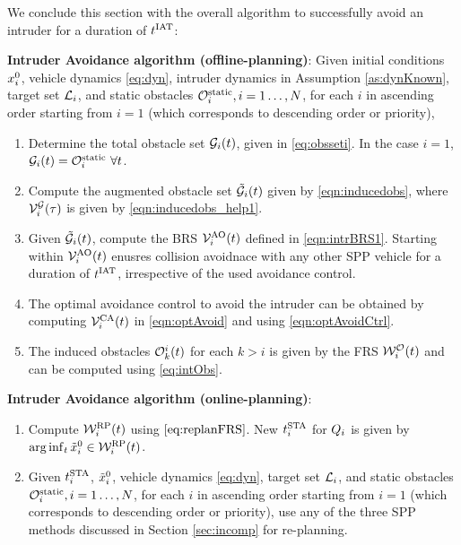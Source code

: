 We conclude this section with the overall algorithm to successfully avoid an intruder for a duration of $t^\text{IAT}$: 
\begin{alg}
\label{alg:intruder}
\textbf{Intruder Avoidance algorithm (offline-planning)}: Given initial conditions $x_i^0$, vehicle dynamics \eqref{eq:dyn}, intruder dynamics in Assumption \ref{as:dynKnown}, target set $\mathcal{L}_i$, and static obstacles $\mathcal{O}^\text{static}_i, i = 1\ldots, N$, for each $i$ in ascending order starting from $i=1$ (which corresponds to descending order or priority),
\begin{enumerate}
\item Determine the total obstacle set $\mathcal{G}_i(t)$, given in \eqref{eq:obsseti}. In the case $i=1$, $\mathcal{G}_i(t) = \mathcal{O}^\text{static}_i ~ \forall t$.
\item Compute the augmented obstacle set $\tilde{\mathcal{G}}_i(t)$ given by \eqref{eqn:inducedobs}, where $\mathcal{V}^{\mathcal{G}}_{i}(\tau)$ is given by \eqref{eqn:inducedobs_help1}.
\item Given $\tilde{\mathcal{G}}_i(t)$, compute the BRS $\mathcal{V}^{\text{AO}}_{i}(t)$ defined in \eqref{eqn:intrBRS1}. Starting within $\mathcal{V}^{\text{AO}}_{i}(t)$ enusres collision avoidnace with any other SPP vehicle for a duration of $t^\text{IAT}$, irrespective of the used avoidance control. 
\item The optimal avoidance control to avoid the intruder can be obtained by computing $\mathcal{V}^{\text{CA}}_{i}(t)$ in \eqref{eqn:optAvoid} and using \eqref{eqn:optAvoidCtrl}. 
\item The induced obstacles $\mathcal{O}_k^i(t)$ for each $k>i$ is given by the FRS $\mathcal{W}_{i}^{\mathcal{O}}(t)$ and can be computed using \eqref{eq:intObs}.
\end{enumerate}

\textbf{Intruder Avoidance algorithm (online-planning)}:
\begin{enumerate}
\item Compute $\mathcal{W}_i^{\text{RP}}(t)$ using $\eqref{eq:replanFRS}$. New $t^\text{STA}_i$ for $Q_i$ is given by $\arg \inf_t \tilde{x}_i^0 \in \mathcal{W}_i^{\text{RP}}(t)$.
\item Given $t^\text{STA}_i$, $\tilde{x}_i^0$, vehicle dynamics \eqref{eq:dyn}, target set $\mathcal{L}_i$, and static obstacles $\mathcal{O}^\text{static}_i, i = 1\ldots, N$, for each $i$ in ascending order starting from $i=1$ (which corresponds to descending order or priority), use any of the three SPP methods discussed in Section \ref{sec:incomp} for re-planning. 
\end{enumerate}
\end{alg}